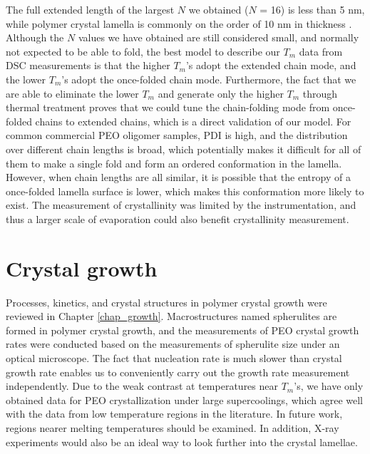 The full extended length of the largest $N$ we obtained ($N$ = 16) is less than 5 nm, while polymer crystal lamella is commonly on the order of 10 nm in thickness \cite{Savage2015}. Although the $N$ values we have obtained are still considered small, and normally not expected to be able to fold, the best model to describe our $T_{m}$ data from DSC measurements is that the higher $T_{m}$’s adopt the extended chain mode, and the lower $T_{m}$’s adopt the once-folded chain mode. Furthermore, the fact that we are able to eliminate the lower $T_{m}$ and generate only the higher $T_{m}$ through thermal treatment proves that we could tune the chain-folding mode from once-folded chains to extended chains, which is a direct validation of our model. For common commercial PEO oligomer samples, PDI is high, and the distribution over different chain lengths is broad, which potentially makes it difficult for all of them to make a single fold and form an ordered conformation in the lamella. However, when chain lengths are all similar, it is possible that the entropy of a once-folded lamella surface is lower, which makes this conformation more likely to exist. The measurement of crystallinity was limited by the instrumentation, and thus a larger scale of evaporation could also benefit crystallinity measurement.

\section{Crystal growth}

Processes, kinetics, and crystal structures in polymer crystal growth were reviewed in Chapter \ref{chap_growth}. Macrostructures named spherulites are formed in polymer crystal growth, and the measurements of PEO crystal growth rates were conducted based on the measurements of spherulite size under an optical microscope. The fact that nucleation rate is much slower than crystal growth rate enables us to conveniently carry out the growth rate measurement independently. Due to the weak contrast at temperatures near $T_{m}$'s, we have only obtained data for PEO crystallization under large supercoolings, which agree well with the data from low temperature regions in the literature. In future work, regions nearer melting temperatures should be examined. In addition, X-ray experiments would also be an ideal way to look further into the crystal lamellae.